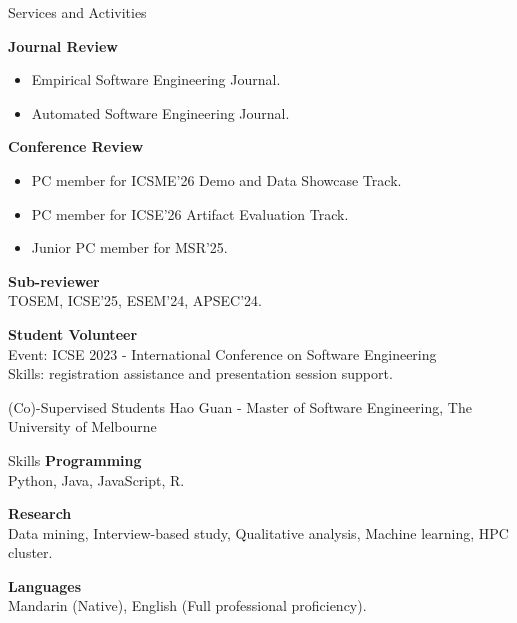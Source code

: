 \documentclass{resume}
\begin{document}
\begin{rSection}{Services and Activities}


\textbf{Journal Review}
\begin{itemize}
    \item Empirical Software Engineering Journal.
    \item Automated Software Engineering Journal.
\end{itemize}

\textbf{Conference Review}
\begin{itemize}
    \item PC member for ICSME'26 Demo and Data Showcase Track.
    \item PC member for ICSE'26 Artifact Evaluation Track.
    \item Junior PC member for MSR'25.

\end{itemize}

\textbf{Sub-reviewer}\\
TOSEM, ICSE'25, ESEM'24, APSEC'24.

\textbf{Student Volunteer} \\
Event: ICSE 2023 - International Conference on Software Engineering\\ 
Skills: registration assistance and presentation session support. 

\end{rSection}




\begin{rSection}{(Co)-Supervised Students}
    Hao Guan - Master of Software Engineering, The University of Melbourne
\end{rSection}


\begin{rSection}{Skills}
{\bf Programming}
\\Python, Java, JavaScript, R.

{\bf Research}
\\Data mining, Interview-based study, Qualitative analysis, Machine learning, HPC cluster.

{\bf Languages}
\\ Mandarin (Native), English (Full professional proficiency).\\
\end{rSection}
\end{document}
